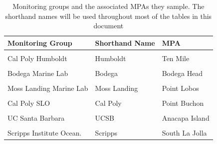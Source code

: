 \documentclass[
]{article}
\begin{document}
\begin{table}

\caption{\label{tab:monitoring}Monitoring groups and the associated MPAs they sample. The shorthand names will be 
  used throughout most of the tables in this document}
\centering
\begin{tabular}[t]{lll}
\toprule
Monitoring Group & Shorthand Name & MPA\\
\midrule
\cellcolor{gray!6}{Cal Poly Humboldt} & \cellcolor{gray!6}{Humboldt} & \cellcolor{gray!6}{South Cape Mendocino}\\
Cal Poly Humboldt & Humboldt & Ten Mile\\
\cellcolor{gray!6}{Bodega Marine Lab} & \cellcolor{gray!6}{Bodega} & \cellcolor{gray!6}{Stewarts Point}\\
Bodega Marine Lab & Bodega & Bodega Head\\
\cellcolor{gray!6}{Moss Landing Marine Lab} & \cellcolor{gray!6}{Moss Landing} & \cellcolor{gray!6}{Año Nuevo}\\
\addlinespace
Moss Landing Marine Lab & Moss Landing & Point Lobos\\
\cellcolor{gray!6}{Cal Poly SLO} & \cellcolor{gray!6}{Cal Poly} & \cellcolor{gray!6}{Piedras Blancas}\\
Cal Poly SLO & Cal Poly & Point Buchon\\
\cellcolor{gray!6}{UC Santa Barbara} & \cellcolor{gray!6}{UCSB} & \cellcolor{gray!6}{Carrington Point}\\
UC Santa Barbara & UCSB & Anacapa Island\\
\addlinespace
\cellcolor{gray!6}{Scripps Institute Ocean.} & \cellcolor{gray!6}{Scripps} & \cellcolor{gray!6}{Swamis}\\
Scripps Institute Ocean. & Scripps & South La Jolla\\
\bottomrule
\end{tabular}
\end{table}

\newpage
\end{document}

